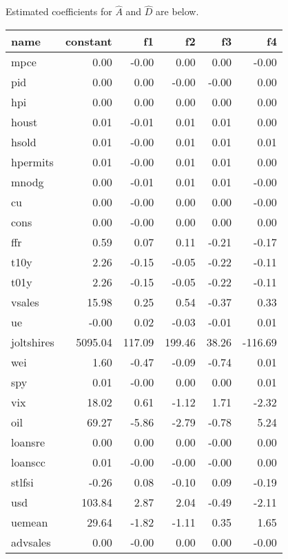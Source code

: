\documentclass[11pt, letterpaper]{article}\usepackage[]{graphicx}\usepackage[]{color}
\begin{document}
Estimated coefficients for $\widehat{A}$ and $\widehat{D}$ are below.
\begin{table}[H]
\centering
\begingroup\footnotesize
\begin{tabular}{lrrrrr}
  \hline
name & constant & f1 & f2 & f3 & f4 \\ 
  \hline
mpce & 0.00 & -0.00 & 0.00 & 0.00 & -0.00 \\ 
  pid & 0.00 & 0.00 & -0.00 & -0.00 & 0.00 \\ 
  hpi & 0.00 & 0.00 & 0.00 & 0.00 & 0.00 \\ 
  houst & 0.01 & -0.01 & 0.01 & 0.01 & 0.00 \\ 
  hsold & 0.01 & -0.00 & 0.01 & 0.01 & 0.01 \\ 
  hpermits & 0.01 & -0.00 & 0.01 & 0.01 & 0.00 \\ 
  mnodg & 0.00 & -0.01 & 0.01 & 0.01 & -0.00 \\ 
  cu & 0.00 & -0.00 & 0.00 & 0.00 & -0.00 \\ 
  cons & 0.00 & -0.00 & 0.00 & 0.00 & 0.00 \\ 
  ffr & 0.59 & 0.07 & 0.11 & -0.21 & -0.17 \\ 
  t10y & 2.26 & -0.15 & -0.05 & -0.22 & -0.11 \\ 
  t01y & 2.26 & -0.15 & -0.05 & -0.22 & -0.11 \\ 
  vsales & 15.98 & 0.25 & 0.54 & -0.37 & 0.33 \\ 
  ue & -0.00 & 0.02 & -0.03 & -0.01 & 0.01 \\ 
  joltshires & 5095.04 & 117.09 & 199.46 & 38.26 & -116.69 \\ 
  wei & 1.60 & -0.47 & -0.09 & -0.74 & 0.01 \\ 
  spy & 0.01 & -0.00 & 0.00 & 0.00 & 0.01 \\ 
  vix & 18.02 & 0.61 & -1.12 & 1.71 & -2.32 \\ 
  oil & 69.27 & -5.86 & -2.79 & -0.78 & 5.24 \\ 
  loansre & 0.00 & 0.00 & 0.00 & -0.00 & 0.00 \\ 
  loanscc & 0.01 & -0.00 & -0.00 & -0.00 & 0.00 \\ 
  stlfsi & -0.26 & 0.08 & -0.10 & 0.09 & -0.19 \\ 
  usd & 103.84 & 2.87 & 2.04 & -0.49 & -2.11 \\ 
  uemean & 29.64 & -1.82 & -1.11 & 0.35 & 1.65 \\ 
  advsales & 0.00 & -0.00 & 0.00 & 0.00 & -0.00 \\ 

\end{tabular}
\end{table}
\end{document}
